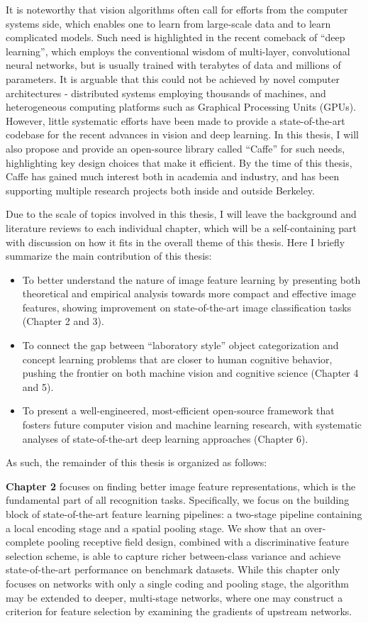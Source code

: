 It is noteworthy that vision algorithms often call for efforts from the computer systems side, which enables one to learn from large-scale data and to learn complicated models. Such need is highlighted in the recent comeback of ``deep learning'', which employs the conventional wisdom of multi-layer, convolutional neural networks, but is usually trained with terabytes of data and millions of parameters. It is arguable that this could not be achieved by novel computer architectures - distributed systems employing thousands of machines, and heterogeneous computing platforms such as Graphical Processing Units (GPUs). However, little systematic efforts have been made to provide a state-of-the-art codebase for the recent advances in vision and deep learning. In this thesis, I will also propose and provide an open-source library called ``Caffe'' for such needs, highlighting key design choices that make it efficient. By the time of this thesis, Caffe has gained much interest both in academia and industry, and has been supporting multiple research projects both inside and outside Berkeley.

Due to the scale of topics involved in this thesis, I will leave the background and literature reviews to each individual chapter, which will be a self-containing part with discussion on how it fits in the overall theme of this thesis. Here I briefly summarize the main contribution of this thesis:
\begin{itemize}
    \item To better understand the nature of image feature learning by presenting both theoretical and empirical analysis towards more compact and effective image features, showing improvement on state-of-the-art image classification tasks (Chapter 2 and 3).
    \item To connect the gap between ``laboratory style'' object categorization and concept learning problems that are closer to human cognitive behavior, pushing the frontier on both machine vision and cognitive science (Chapter 4 and 5).
    \item To present a well-engineered, most-efficient open-source framework that fosters future computer vision and machine learning research, with systematic analyses of state-of-the-art deep learning approaches (Chapter 6).
\end{itemize}

As such, the remainder of this thesis is organized as follows:

{\bfseries Chapter 2} focuses on finding better image feature representations, which is the fundamental part of all recognition tasks. Specifically, we focus on the building block of state-of-the-art feature learning pipelines: a two-stage pipeline containing a local encoding stage and a spatial pooling stage. We show that an over-complete pooling receptive field design, combined with a discriminative feature selection scheme, is able to capture richer between-class variance and achieve state-of-the-art performance on benchmark datasets. While this chapter only focuses on networks with only a single coding and pooling stage, the algorithm may be extended to deeper, multi-stage networks, where one may construct a criterion for feature selection by examining the gradients of upstream networks.

